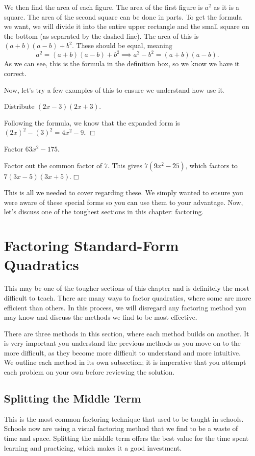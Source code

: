 \documentclass[../book.tex]{subfiles}
\begin{document}
We then find the area of each figure.  The area of the first figure is $a^2$ as it is a square.  The area of the second square can be done in parts.  To get the formula we want, we will divide it into the entire upper rectangle and the small square on the bottom (as separated by the dashed line).  The area of this is $(a+b)(a-b)+b^2$.  These should be equal, meaning $$a^2=(a+b)(a-b)+b^2 \implies a^2-b^2=(a+b)(a-b).$$
As we can see, this is the formula in the definition box, so we know we have it correct.

Now, let's try a few examples of this to ensure we understand how use it.
\begin{example}
Distribute $(2x-3)(2x+3)$.
\end{example}
\begin{solution}
Following the formula, we know that the expanded form is $(2x)^2-(3)^2=4x^2-9$.  $\Box$
\end{solution}
\begin{example}
Factor $63x^2-175$.
\end{example}
\begin{solution}
Factor out the common factor of $7$.  This gives $7(9x^2-25)$, which factors to $7(3x-5)(3x+5)$.$\Box$ 
\end{solution} 
This is all we needed to cover regarding these.  We simply wanted to ensure you were aware of these special forms so you can use them to your advantage.  Now, let's discuss one of the toughest sections in this chapter: factoring.
\section{Factoring Standard-Form Quadratics}
\noindent This may be one of the tougher sections of this chapter and is definitely the most difficult to teach.  There are many ways to factor quadratics, where some are more efficient than others.  In this process, we will disregard any factoring method you may know and discuss the methods we find to be most effective.  

There are three methods in this section, where each method builds on another.  It is very important you understand the previous methods as you move on to the more difficult, as they become more difficult to understand and more intuitive.  We outline each method in its own subsection; it is imperative that you attempt each problem on your own before reviewing the solution.
\subsection{Splitting the Middle Term}
\noindent This is the most common factoring technique that used to be taught in schools.  Schools now are using a visual factoring method that we find to be a waste of time and space.  Splitting the middle term offers the best value for the time spent learning and practicing, which makes it a good investment.
\end{document}

